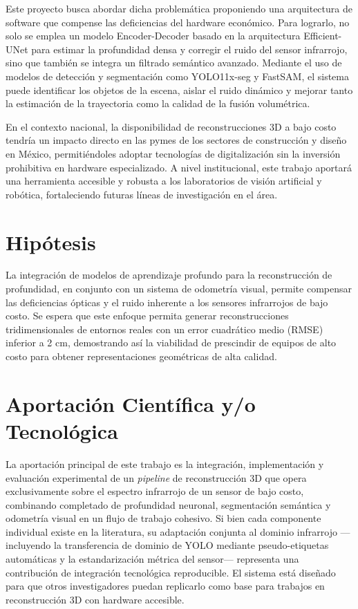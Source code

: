 \documentclass[12pt, a4, twoside, openany]{report}
\begin{document}
Este proyecto busca abordar dicha problemática proponiendo una arquitectura de software que compense las deficiencias del hardware económico. Para lograrlo, no solo se emplea un modelo Encoder-Decoder basado en la arquitectura Efficient-UNet para estimar la profundidad densa y corregir el ruido del sensor infrarrojo, sino que también se integra un filtrado semántico avanzado. Mediante el uso de modelos de detección y segmentación como YOLO11x-seg y FastSAM, el sistema puede identificar los objetos de la escena, aislar el ruido dinámico y mejorar tanto la estimación de la trayectoria como la calidad de la fusión volumétrica.

En el contexto nacional, la disponibilidad de reconstrucciones 3D a bajo costo tendría un impacto directo en las pymes de los sectores de construcción y diseño en México, permitiéndoles adoptar tecnologías de digitalización sin la inversión prohibitiva en hardware especializado. A nivel institucional, este trabajo aportará una herramienta accesible y robusta a los laboratorios de visión artificial y robótica, fortaleciendo futuras líneas de investigación en el área.

\section{Hipótesis}

La integración de modelos de aprendizaje profundo para la reconstrucción de profundidad, en conjunto con un sistema de odometría visual, permite compensar las deficiencias ópticas y el ruido inherente a los sensores infrarrojos de bajo costo. Se espera que este enfoque permita generar reconstrucciones tridimensionales de entornos reales con un error cuadrático medio (RMSE) inferior a 2 cm, demostrando así la viabilidad de prescindir de equipos de alto costo para obtener representaciones geométricas de alta calidad.

\section{Aportación Científica y/o Tecnológica}

La aportación principal de este trabajo es la integración, implementación y evaluación experimental de un \textit{pipeline} de reconstrucción 3D que opera exclusivamente sobre el espectro infrarrojo de un sensor de bajo costo, combinando completado de profundidad neuronal, segmentación semántica y odometría visual en un flujo de trabajo cohesivo. Si bien cada componente individual existe en la literatura, su adaptación conjunta al dominio infrarrojo ---incluyendo la transferencia de dominio de YOLO mediante pseudo-etiquetas automáticas y la estandarización métrica del sensor--- representa una contribución de integración tecnológica reproducible. El sistema está diseñado para que otros investigadores puedan replicarlo como base para trabajos en reconstrucción 3D con hardware accesible.
\end{document}
